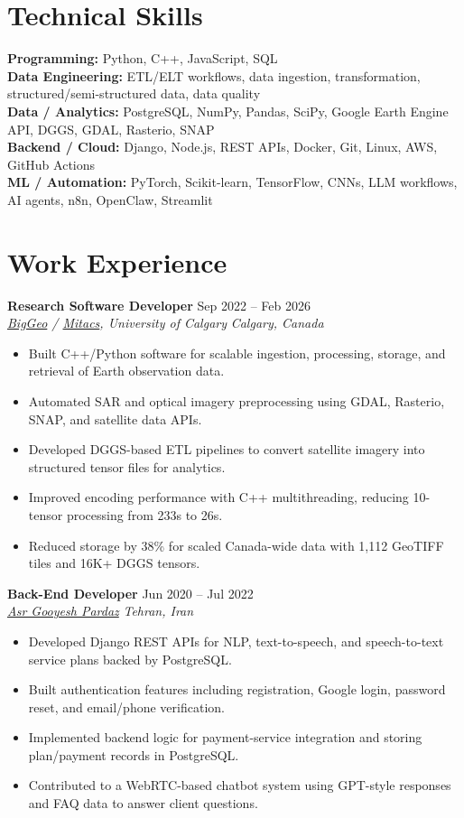\documentclass[a4paper,10pt]{article}
\newcommand{\resumeSubheading}[4]{
    \textbf{#1} \hfill #2 \\
    \textit{#3} \hfill \textit{#4}
}
\begin{document}
\section*{Technical Skills}

\textbf{Programming:} Python, C++, JavaScript, SQL \\
\textbf{Data Engineering:} ETL/ELT workflows, data ingestion, transformation, structured/semi-structured data, data quality \\
\textbf{Data / Analytics:} PostgreSQL, NumPy, Pandas, SciPy, Google Earth Engine API, DGGS, GDAL, Rasterio, SNAP \\
\textbf{Backend / Cloud:} Django, Node.js, REST APIs, Docker, Git, Linux, AWS, GitHub Actions \\
\textbf{ML / Automation:} PyTorch, Scikit-learn, TensorFlow, CNNs, LLM workflows, AI agents, n8n, OpenClaw, Streamlit


\section*{Work Experience}

\resumeSubheading
{Research Software Developer}
{Sep 2022 -- Feb 2026}
{\href{https://biggeo.com}{BigGeo} / \href{https://www.mitacs.ca/}{Mitacs}, University of Calgary}
{Calgary, Canada}
\begin{itemize}[leftmargin=0.25in]
    \item Built C++/Python software for scalable ingestion, processing, storage, and retrieval of Earth observation data.
    \item Automated SAR and optical imagery preprocessing using GDAL, Rasterio, SNAP, and satellite data APIs.
    \item Developed DGGS-based ETL pipelines to convert satellite imagery into structured tensor files for analytics.
    \item Improved encoding performance with C++ multithreading, reducing 10-tensor processing from 233s to 26s.
    \item Reduced storage by 38\% for scaled Canada-wide data with 1,112 GeoTIFF tiles and 16K+ DGGS tensors.
\end{itemize}

\resumeSubheading
{Back-End Developer}
{Jun 2020 -- Jul 2022}
{\href{https://asr-gooyesh.com/en/}{Asr Gooyesh Pardaz}}
{Tehran, Iran}
\begin{itemize}[leftmargin=0.25in]
    \item Developed Django REST APIs for NLP, text-to-speech, and speech-to-text service plans backed by PostgreSQL.
    \item Built authentication features including registration, Google login, password reset, and email/phone verification.
    \item Implemented backend logic for payment-service integration and storing plan/payment records in PostgreSQL.
    \item Contributed to a WebRTC-based chatbot system using GPT-style responses and FAQ data to answer client questions.
\end{itemize}
\end{document}
